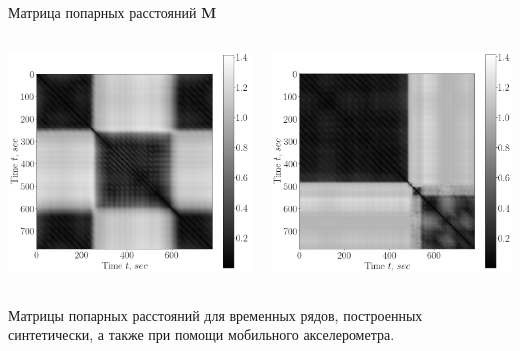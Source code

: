\documentclass[10pt,pdf,hyperref={unicode}]{beamer}
\begin{document}
\begin{frame}[shrink=5]{Матрица попарных расстояний $\textbf{M}$}
\begin{columns}
    \begin{column}{0.35\textwidth}
        \includegraphics[width=1\textwidth]{results/real_1_full}
    \end{column}
    \begin{column}{0.35\textwidth}
        \includegraphics[width=1\textwidth]{results/real_2_full}
    \end{column}
\end{columns}

Матрицы попарных расстояний для временных рядов, построенных синтетически, а также при помощи мобильного акселерометра.

\end{frame}
\end{document}

